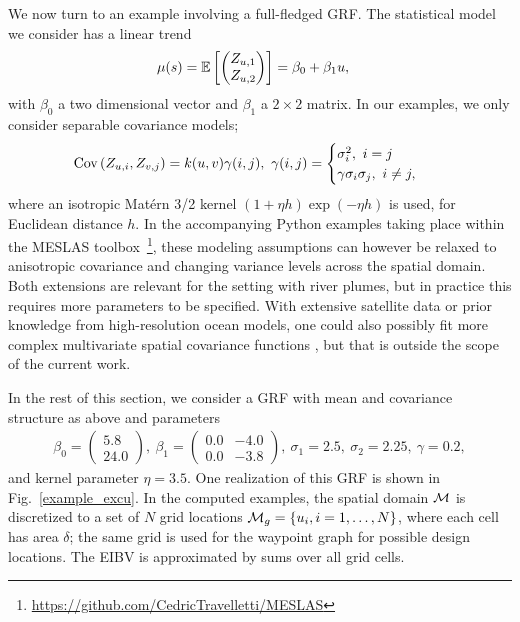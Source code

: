 \documentclass[aoas,preprint]{imsart}
\begin{document}
We now turn to an example involving a full-fledged GRF. The statistical model we consider has a linear trend
\begin{align*}
\mu(s)=\mathbb{E}\left[\begin{pmatrix}
Z_{\spatloc, 1}\\ Z_{\spatloc, 2}
\end{pmatrix}\right] &= \beta_0 + \beta_1 \spatloc,
\end{align*}
with $\beta_0$ a two dimensional vector and $\beta_1$ a $2\times 2$ matrix. In our examples, we only consider separable covariance models;
\begin{align*}
\textrm{Cov}\left(Z_{\spatloc, i}, Z_{v, j}\right) &= k(\spatloc, v) \gamma(i, j),~ \gamma(i, j) = \begin{cases} \sigma_i^2,~ i=j\\
   \gamma \sigma_i \sigma_j,~i\neq j,
        \end{cases}
\end{align*}
where an isotropic Mat\'{e}rn 3/2 kernel $(1+\eta h)\exp (-\eta h)$ is
used, for Euclidean distance $h$.  In the accompanying Python examples
taking place within the MESLAS
toolbox~\footnote{\url{https://github.com/CedricTravelletti/MESLAS}},
these modeling assumptions can however be relaxed to anisotropic
covariance and changing variance levels across the spatial
domain. Both extensions are relevant for the setting with river
plumes, but in practice this requires more parameters to be
specified. With extensive satellite data or prior knowledge from
high-resolution ocean models, one could also possibly fit more complex
multivariate spatial covariance functions
\citep{gneiting2010matern,genton2015cross}, but that is outside the
scope of the current work.

In the rest of this section, we consider a GRF with mean and
covariance structure as above and parameters
\begin{align*}
\beta_0 = \begin{pmatrix}
5.8\\ 24.0
\end{pmatrix}, ~ \beta_1 = \begin{pmatrix}
0.0 & -4.0\\
0.0 & -3.8
\end{pmatrix},~ \sigma_1 = 2.5,~ \sigma_2 = 2.25, ~ \gamma = 0.2,
\end{align*}
and kernel parameter $\eta=3.5$.
One realization of this GRF is shown in Fig.~\ref{example_excu}.
In the computed examples, the spatial domain $\mathcal{M}$ is
discretized to a set of $N$ grid locations
$\mathcal{M}_g = \{u_i, i=1,\ldots,N \}$, where each cell has area
$\delta$; the same grid is used for the waypoint graph for possible
design locations. The EIBV is approximated by sums over all grid
cells. 
\end{document}

